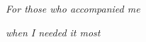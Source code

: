 \documentclass[../thesis.tex]{subfiles}
\begin{document}
\begin{dedication}
    \centering
    \textit{For those who accompanied me}
    
    \textit{when I needed it most}
\end{dedication}
\end{document}
